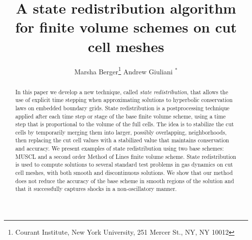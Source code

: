 \documentclass[12pt]{article}
\begin{document}
\date{}

\title{A state redistribution algorithm for finite volume schemes
on cut cell meshes}
\author{Marsha Berger\footnote{Courant Institute, New York University, 251 Mercer St.,
NY, NY 10012}  \hspace{1in} Andrew Giuliani $^*$}

\maketitle

\begin{abstract}
In this paper we develop a new technique, called \textit{state redistribution}, 
that allows the use of explicit time stepping when approximating
solutions to hyperbolic conservation laws on embedded boundary grids.  
State redistribution is a postprocessing technique applied after each time 
step or stage of the base finite volume scheme, using a time step
that is proportional to the volume of the full cells.  The idea is to 
stabilize the cut cells by temporarily merging them into larger, 
possibly overlapping, neighborhoods, 
then replacing the cut cell values with a stabilized value
that maintains conservation and accuracy.
We present examples of state redistribution using two base schemes:
MUSCL and a second order Method of Lines finite volume scheme. 
State redistribution is used to compute solutions to several 
standard test problems in gas dynamics on cut cell meshes, with both
smooth and discontinuous solutions. We show that our method does not 
reduce the accuracy of the base scheme in smooth regions of the solution and 
that it successfully captures shocks in a non-oscillatory manner.
\end{abstract}







%




\newpage
\small


\end{document}
